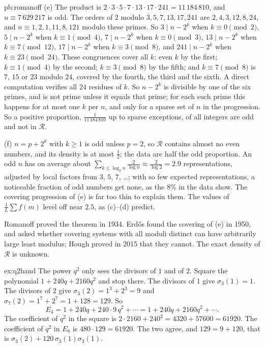 \begin{solution}{pb:romanoff}
(e) The product is $2\cdot3\cdot5\cdot7\cdot13\cdot17\cdot241=11\,184\,810$, and $n\equiv7\,629\,217$ is odd. The orders of $2$ modulo $3,5,7,13,17,241$ are $2,4,3,12,8,24$, and $n\equiv1,2,1,11,8,121$ modulo these primes. So $3\mid n-2^k$ when $k\equiv0\pmod2$,
$5\mid n-2^k$ when $k\equiv1\pmod4$, $7\mid n-2^k$ when $k\equiv0\pmod3$, $13\mid n-2^k$ when $k\equiv7\pmod{12}$, $17\mid n-2^k$ when $k\equiv3\pmod8$, and $241\mid n-2^k$ when
$k\equiv23\pmod{24}$. These congruences cover all $k$: even $k$ by the first; $k\equiv1\pmod4$ by the second; $k\equiv3\pmod8$ by the fifth; and $k\equiv7\pmod8$ is $7$, $15$ or $23$ modulo
$24$, covered by the fourth, the third and the sixth. A direct computation verifies all $24$ residues of $k$. So $n-2^k$ is
divisible by one of the six primes, and is not prime unless it equals that prime; for each such prime this happens for at most one $k$ per $n$, and only for a sparse set of $n$
in the progression. So a positive proportion, $\frac1{11\,184\,810}$ up to sparse exceptions, of all integers are odd and not in $\mathcal R$.

(f) $n=p+2^k$ with $k\ge1$ is odd unless $p=2$, so $\mathcal R$ contains almost no even numbers, and its density is at most $\frac12$; the data are half the odd proportion. An odd $n$
has on average about $\sum_{k\le\log_2n}\frac{2}{\log n}\approx\frac2{\log2}=2.9$ representations, adjusted by local factors from $3$, $5$, $7$, \dots; with so few expected
representations, a noticeable fraction of odd numbers get none, as the $8\%$ in the data show. The covering progression of (e) is far too thin to explain them. The values of
$\frac1L\sum f(m)$ level off near $2.5$, as (c)--(d) predict.


\leads Romanoff proved the theorem in 1934. Erd\H os found the covering of (e) in 1950, and asked whether covering systems with all moduli distinct can have arbitrarily large
least modulus; Hough proved in 2015 that they cannot. The exact density of $\mathcal R$ is unknown.
\end{solution}


\begin{solution}{ex:q2hand}
\idea The power $q^2$ only sees the divisors of $1$ and of $2$. Square the polynomial $1+240q+2160q^2$ and stop there.
\writeup The divisors of $1$ give $\sigma_3(1)=1$. The divisors of $2$ give $\sigma_3(2)=1^3+2^3=9$ and $\sigma_7(2)=1^7+2^7=1+128=129$. So
\[
E_4=1+240q+240\cdot9\,q^2+\cdots=1+240q+2160q^2+\cdots.
\]
The coefficient of $q^2$ in the square is $2\cdot2160+240^2=4320+57600=61920$. The coefficient of $q^2$ in $E_8$ is $480\cdot129=61920$. The two agree, and $129=9+120$, that is $\sigma_3(2)+120\,\sigma_3(1)\sigma_3(1)$.
\end{solution}

